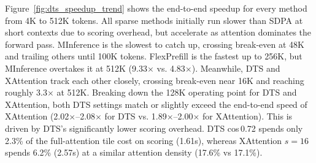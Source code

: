 Figure~\ref{fig:dts_speedup_trend} shows the end-to-end speedup for every method from 4K to 512K tokens. All sparse methods initially run slower than SDPA at short contexts due to scoring overhead, but accelerate as attention dominates the forward pass. MInference is the slowest to catch up, crossing break-even at 48K and trailing others until 100K tokens. FlexPrefill is the fastest up to 256K, but MInference overtakes it at 512K (9.33$\times$ vs. 4.83$\times$). Meanwhile, DTS and XAttention track each other closely, crossing break-even near 16K and reaching roughly 3.3$\times$ at 512K. Breaking down the 128K operating point for DTS and XAttention, both DTS settings match or slightly exceed the end-to-end speed of XAttention (2.02$\times$--2.08$\times$ for DTS vs. 1.89$\times$--2.00$\times$ for XAttention). This is driven by DTS's significantly lower scoring overhead. DTS cos\,0.72 spends only 2.3\% of the full-attention tile cost on scoring (1.61s), whereas XAttention $s{=}16$ spends 6.2\% (2.57s) at a similar attention density (17.6\% vs 17.1\%).






